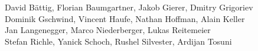%
%
%
David Bättig,		%
Florian Baumgartner,	%
Jakob Gierer,		%
Dmitry Grigoriev%
\\
Dominik Gschwind,	%
Vincent Haufe,		%
Nathan Hoffman,		%
Alain Keller%
\\
Jan Langenegger,	%
Marco Niederberger,	%
Lukas Reitemeier%
\\
Stefan Richle,		%
Yanick Schoch,		%
Rushel Silvester,
Ardijan Tosuni%

